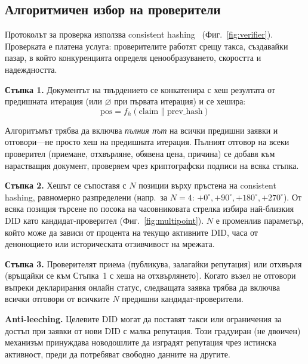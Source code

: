 \documentclass[11pt,a4paper,twocolumn]{article}
\begin{document}
\subsection{Алгоритмичен избор на проверители}

Протоколът за проверка използва consistent hashing~\cite{karger1997} (Фиг.~\ref{fig:verifier}). Проверката е платена услуга: проверителите работят срещу такса, създавайки пазар, в който конкуренцията определя ценообразуването, скоростта и надеждността.

\textbf{Стъпка 1.} Документът на твърдението се конкатенира с хеш резултата от предишната итерация (или $\varnothing$ при първата итерация) и се хешира:
\begin{equation}
\text{pos} = f_h(\text{claim} \| \text{prev\_hash})
\label{eq:hash}
\end{equation}

Алгоритъмът трябва да включва \emph{пълния път} на всички предишни заявки и отговори---не просто хеш на предишната итерация. Пълният отговор на всеки проверител (приемане, отхвърляне, обявена цена, причина) се добавя към нарастващия документ, проверяем чрез криптографски подписи на всяка стъпка.

\textbf{Стъпка 2.} Хешът се съпоставя с $N$ позиции върху пръстена на consistent hashing, равномерно разпределени (напр.\ за $N=4$: $+0^{\circ}, +90^{\circ}, +180^{\circ}, +270^{\circ}$). От всяка позиция търсене по посока на часовниковата стрелка избира най-близкия DID като кандидат-проверител (Фиг.~\ref{fig:multipoint}). $N$ е променлив параметър, който може да зависи от процента на текущо активните DID, часа от денонощието или историческата отзивчивост на мрежата.

\textbf{Стъпка 3.} Проверителят приема (публикува, залагайки репутация) или отхвърля (връщайки се към Стъпка~1 с хеша на отхвърлянето). Когато възел не отговори въпреки декларирания онлайн статус, следващата заявка трябва да включва всички отговори от всичките $N$ предишни кандидат-проверители.

\textbf{Anti-leeching.} Целевите DID могат да поставят такси или ограничения за достъп при заявки от нови DID с малка репутация. Този градуиран (не двоичен) механизъм принуждава новодошлите да изградят репутация чрез истинска активност, преди да потребяват свободно данните на другите.
\end{document}
